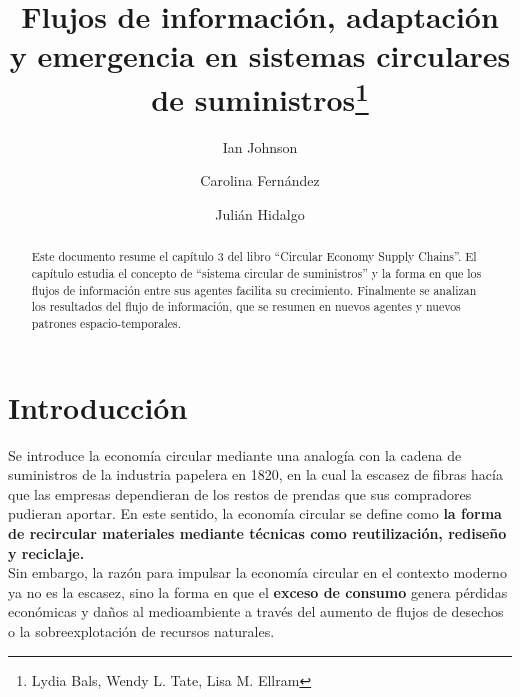 \documentclass[runningheads]{llncs}
\begin{document}
\title{Flujos de información, adaptación y emergencia en sistemas
circulares de
suministros\thanks{Lydia Bals, Wendy L. Tate, Lisa M. Ellram}}
%
%
\author{Ian Johnson \and Carolina
Fernández \and Julián
Hidalgo}


%


\maketitle              %
%
\begin{abstract}
Este documento resume el capítulo 3 del libro ``Circular Economy Supply
Chains''. El capítulo estudia el concepto de ``sistema circular de
suministros'' y la forma en que los flujos de información entre sus
agentes facilita su crecimiento. Finalmente se analizan los resultados
del flujo de información, que se resumen en nuevos agentes y nuevos
patrones espacio-temporales.


\end{abstract}

\hypertarget{introducciuxf3n}{%
\section{Introducción}\label{introducciuxf3n}}

Se introduce la economía circular mediante una analogía con la cadena de
suministros de la industria papelera en 1820, en la cual la escasez de
fibras hacía que las empresas dependieran de los restos de prendas que
sus compradores pudieran aportar. En este sentido, la economía circular
se define como
\textbf{la forma de recircular materiales mediante técnicas como reutilización, rediseño y reciclaje.}\\

Sin embargo, la razón para impulsar la economía circular en el contexto
moderno ya no es la escasez, sino la forma en que el
\textbf{exceso de consumo} genera pérdidas económicas y daños al
medioambiente a través del aumento de flujos de desechos o la
sobreexplotación de recursos naturales.\\
\end{document}
